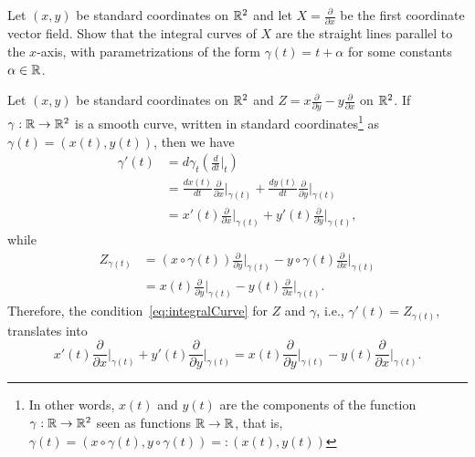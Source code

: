\begin{exercise}
  Let $(x,y)$ be standard coordinates on $\mathbb{R}^2$ and let $X=\frac{\partial}{\partial x}$ be the first coordinate vector field.
  Show that the integral curves of $X$ are the straight lines parallel to the $x$-axis, with parametrizations of the form $\gamma(t) = t + \alpha$ for some constants $\alpha \in\mathbb{R}$.
\end{exercise}

\begin{example}\label{ex:rotation}
  Let $(x,y)$ be standard coordinates on $\mathbb{R}^2$ and $Z = x\frac{\partial}{\partial y} - y\frac{\partial}{\partial x}$ on $\mathbb{R}^2$.
  If $\gamma:\mathbb{R}\to\mathbb{R}^2$ is a smooth curve, written in standard coordinates\footnote{In other words, $x(t)$ and $y(t)$ are the components of the function $\gamma : \mathbb{R} \to \mathbb{R}^2$ seen as functions $\mathbb{R}\to\mathbb{R}$, that is, ${\gamma(t) = (x\circ \gamma(t), y\circ \gamma(t)) =: (x(t), y(t))}$} as $\gamma(t) = (x(t), y(t))$, then we have
  \begin{align}
    \gamma'(t)
    &= d\gamma_t\left(\frac{d}{dt}\Big|_t\right) \\
    &= \frac{d x(t)}{d t} \frac{\partial}{\partial x}\Big|_{\gamma(t)} + \frac{d y(t)}{d t} \frac{\partial}{\partial y}\Big|_{\gamma(t)} \\
    &= x'(t)\frac{\partial}{\partial x}\Big|_{\gamma(t)} + y'(t)\frac{\partial}{\partial y}\Big|_{\gamma(t)},
  \end{align}
  while
  \begin{align}
    Z_{\gamma(t)}
    &= (x\circ \gamma(t))\frac{\partial}{\partial y}\Big|_{\gamma(t)} - y \circ \gamma(t)\frac{\partial}{\partial x}\Big|_{\gamma(t)} \\
    &= x(t)\frac{\partial}{\partial y}\Big|_{\gamma(t)} - y(t)\frac{\partial}{\partial x}\Big|_{\gamma(t)}.
  \end{align}
  Therefore, the condition~\eqref{eq:integralCurve} for $Z$ and $\gamma$, i.e., $\gamma'(t) = Z_{\gamma(t)}$, translates into
  \begin{equation}
    x'(t)\frac{\partial}{\partial x}\Big|_{\gamma(t)} + y'(t)\frac{\partial}{\partial y}\Big|_{\gamma(t)} = x(t)\frac{\partial}{\partial y}\Big|_{\gamma(t)} - y(t)\frac{\partial}{\partial x}\Big|_{\gamma(t)}.
  \end{equation}
  \begin{marginfigure}

\end{marginfigure}
\end{example}
